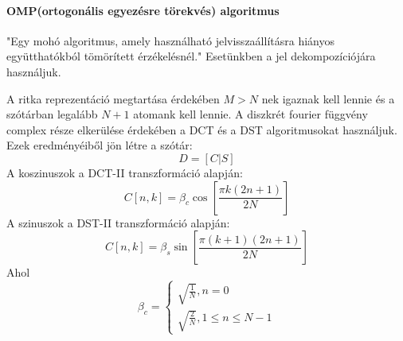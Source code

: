 \paragraph*{OMP(ortogonális egyezésre törekvés) algoritmus}
"Egy mohó algoritmus, amely használható jelvisszaállításra hiányos együtthatókból tömörített érzékelésnél."\cite{noise_reduction_omp} Esetünkben a jel dekompozíciójára használjuk.

A ritka reprezentáció megtartása érdekében $M > N$ nek igaznak kell lennie és a szótárban legalább $N + 1$ atomank kell lennie.
A diszkrét fourier függvény complex része elkerülése érdekében a DCT és a DST algoritmusokat használjuk. Ezek eredményéiből jön létre a szótár: \[D = [C|S]\]
A koszinuszok a DCT-II transzformáció alapján: \[C[n, k] = \beta_c \cos[\frac{\pi k (2n + 1)}{2N}]\]
A szinuszok a DST-II transzformáció alapján: \[C[n, k] = \beta_s \sin[\frac{\pi (k + 1) (2n + 1)}{2N}]\]
Ahol 
\begin{equation}
    \beta_c =
    \begin{cases}
        \sqrt{\frac{1}{N}}, n = 0\\
        \sqrt{\frac{2}{N}}, 1 \leq n \leq N - 1
    \end{cases}
\end{equation}
